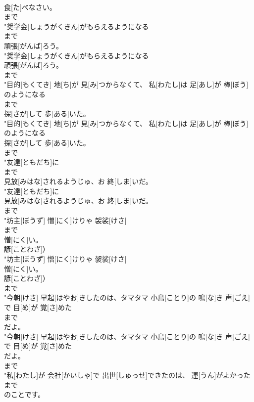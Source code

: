 \documentclass[8pt]{extreport}
\begin{document}
\begin{CJK}{UTF8}{min}
\\	食[た]べなさい。
\\	まで
\\	"奨学金[しょうがくきん]がもらえるようになる
\\	まで
\\	頑張[がんば]ろう。
\\	"奨学金[しょうがくきん]がもらえるようになる
\\	頑張[がんば]ろう。
\\	まで
\\	"目的[もくてき] 地[ち]が 見[み]つからなくて、 私[わたし]は 足[あし]が 棒[ぼう]のようになる
\\	まで
\\	探[さが]して 歩[ある]いた。
\\	"目的[もくてき] 地[ち]が 見[み]つからなくて、 私[わたし]は 足[あし]が 棒[ぼう]のようになる
\\	探[さが]して 歩[ある]いた。
\\	まで
\\	"友達[ともだち]に
\\	まで
\\	見放[みはな]されるようじゅ、お 終[しま]いだ。
\\	"友達[ともだち]に
\\	見放[みはな]されるようじゅ、お 終[しま]いだ。
\\	まで
\\	"坊主[ぼうず] 憎[にく]けりゃ 袈裟[けさ]
\\	まで
\\	憎[にく]い。
\\	諺[ことわざ]）
\\	"坊主[ぼうず] 憎[にく]けりゃ 袈裟[けさ]
\\	憎[にく]い。
\\	諺[ことわざ]）
\\	まで
\\	"今朝[けさ] 早起[はやお]きしたのは、タマタマ 小鳥[ことり]の 鳴[な]き 声[ごえ]で 目[め]が 覚[さ]めた
\\	まで
\\	だよ。
\\	"今朝[けさ] 早起[はやお]きしたのは、タマタマ 小鳥[ことり]の 鳴[な]き 声[ごえ]で 目[め]が 覚[さ]めた
\\	だよ。
\\	まで
\\	"私[わたし]が 会社[かいしゃ]で 出世[しゅっせ]できたのは、 運[うん]がよかった
\\	まで
\\	のことです。

\end{CJK}
\end{document}
